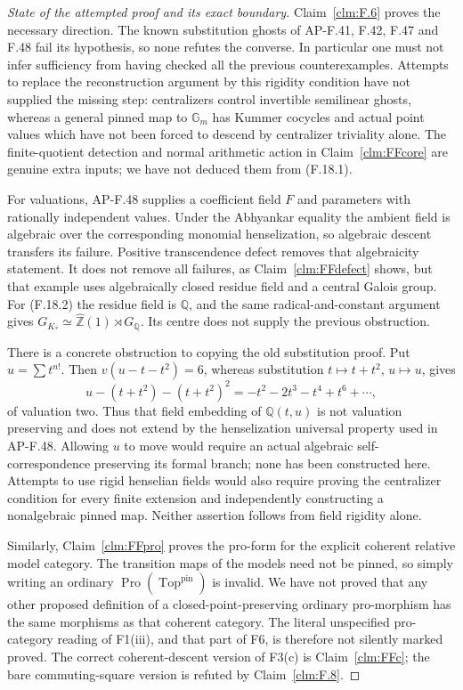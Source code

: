 \documentclass[11pt]{article}
\begin{document}
\begin{proof}[State of the attempted proof and its exact boundary]
Claim~\ref{clm:F.6} proves the necessary direction. The known
substitution ghosts of AP-F.41, F.42, F.47 and F.48 fail its
hypothesis, so none refutes the converse. In particular one must
not infer sufficiency from having checked all the previous
counterexamples. Attempts to replace the reconstruction argument
by this rigidity condition have not supplied the missing step:
centralizers control invertible semilinear ghosts, whereas a
general pinned map to \(\mathbb G_m\) has Kummer cocycles and
actual point values which have not been forced to descend by
centralizer triviality alone. The finite-quotient detection and
normal arithmetic action in Claim~\ref{clm:FFcore} are genuine
extra inputs; we have not deduced them from (F.18.1).

For valuations, AP-F.48 supplies a coefficient field \(F\) and
parameters with rationally independent values. Under the
Abhyankar equality the ambient field is algebraic over the
corresponding monomial henselization, so algebraic descent
transfers its failure. Positive transcendence defect removes
that algebraicity statement. It does not remove all failures,
as Claim~\ref{clm:FFdefect} shows, but that example uses
algebraically closed residue field and a central Galois group.
For (F.18.2) the residue field is \(\mathbb Q\), and the
same radical-and-constant argument gives
\(G_{K_*}\simeq\widehat{\mathbb Z}(1)\rtimes G_{\mathbb Q}\).
Its centre does not supply the previous obstruction.

There is a concrete obstruction to copying the old substitution
proof. Put \(u=\sum t^{n!}\). Then
\(v(u-t-t^2)=6\), whereas substitution
\(t\mapsto t+t^2\), \(u\mapsto u\), gives
\[
 u-(t+t^2)-(t+t^2)^2
       =-t^2-2t^3-t^4+t^6+\cdots,
\]
of valuation two. Thus that field embedding of
\(\mathbb Q(t,u)\) is not valuation preserving and does not
extend by the henselization universal property used in AP-F.48.
Allowing \(u\) to move would require an actual algebraic
self-correspondence preserving its formal branch; none has been
constructed here. Attempts to use rigid henselian fields would
also require proving the centralizer condition for every finite
extension and independently constructing a nonalgebraic pinned
map. Neither assertion follows from field rigidity alone.

Similarly, Claim~\ref{clm:FFpro} proves the pro-form for the
explicit coherent relative model category. The transition maps
of the models need not be pinned, so simply writing an ordinary
\(\operatorname{Pro}(\operatorname{Top}^{\mathrm{pin}})\)
is invalid. We have not proved that any other proposed definition
of a closed-point-preserving ordinary pro-morphism has the same
morphisms as that coherent category. The literal unspecified
pro-category reading of F1(iii), and that part of F6, is therefore
not silently marked proved. The correct coherent-descent version
of F3(c) is Claim~\ref{clm:FFc}; the bare commuting-square
version is refuted by Claim~\ref{clm:F.8}.
\end{proof}
\end{document}
